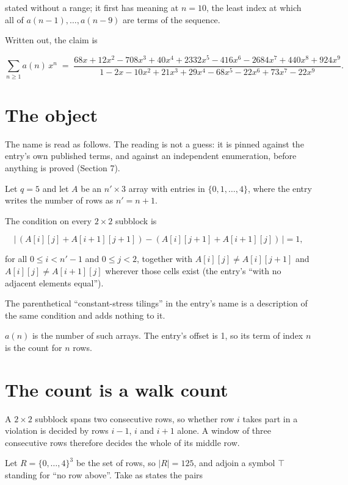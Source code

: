 \documentclass[11pt]{article}
\theoremstyle{definition}
\begin{document}
stated without a range; it first has meaning at $n = 10$, the least index at which all of $a(n-1),\dots,a(n-9)$ are terms of the sequence.

Written out, the claim is

\[\sum_{n \ge 1} a(n)\,x^n \;=\; \frac{68x + 12x^{2} - 708x^{3} + 40x^{4} + 2332x^{5} - 416x^{6} - 2684x^{7} + 440x^{8} + 924x^{9}}{1 - 2x - 10x^{2} + 21x^{3} + 29x^{4} - 68x^{5} - 22x^{6} + 73x^{7} - 22x^{9}}.\]

\section{The object}

The name is read as follows. The reading is not a guess: it is pinned against the entry's own published terms, and against an independent enumeration, before anything is proved (Section 7).

Let $q = 5$ and let $A$ be an $n' \times 3$ array with entries in $\{0,1,\dots,4\}$, where the entry writes the number of rows as $n' = n + 1$.

The condition on every $2 \times 2$ subblock is

\[\bigl|\,(A[i][j] + A[i{+}1][j{+}1]) - (A[i][j{+}1] + A[i{+}1][j])\,\bigr| = 1,\]

for all $0 \le i < n'-1$ and $0 \le j < 2$, together with $A[i][j] \ne A[i][j{+}1]$ and $A[i][j] \ne A[i{+}1][j]$ wherever those cells exist (the entry's ``with no adjacent elements equal'').

The parenthetical ``constant-stress tilings'' in the entry's name is a description of the same condition and adds nothing to it.

$a(n)$ is the number of such arrays. The entry's offset is 1, so its term of index $n$ is the count for $n$ rows.

\section{The count is a walk count}

A $2 \times 2$ subblock spans two consecutive rows, so whether row $i$ takes part in a violation is decided by rows $i-1$, $i$ and $i+1$ alone. A window of three consecutive rows therefore decides the whole of its middle row.

Let $R = \{0,\dots,4\}^{3}$ be the set of rows, so $|R| = 125$, and adjoin a symbol $\top$ standing for ``no row above''. Take as states the pairs
\end{document}
